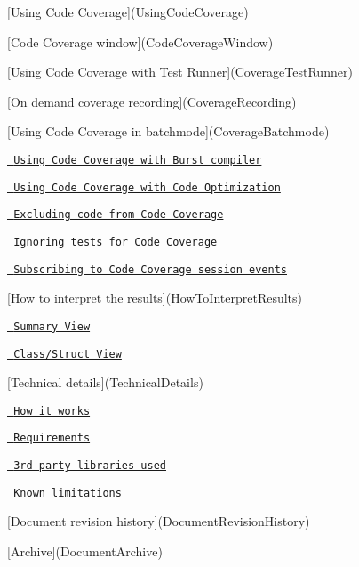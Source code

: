 \mbox{[}Using Code Coverage\mbox{]}(Using\+Code\+Coverage)
\begin{DoxyItemize}
\item \mbox{[}Code Coverage window\mbox{]}(Code\+Coverage\+Window)
\item \mbox{[}Using Code Coverage with Test Runner\mbox{]}(Coverage\+Test\+Runner)
\item \mbox{[}On demand coverage recording\mbox{]}(Coverage\+Recording)
\item \mbox{[}Using Code Coverage in batchmode\mbox{]}(Coverage\+Batchmode)
\item \href{UsingCodeCoverage\#using-code-coverage-with-burst-compiler}{\texttt{ Using Code Coverage with Burst compiler}}
\item \href{UsingCodeCoverage\#using-code-coverage-with-code-optimization}{\texttt{ Using Code Coverage with Code Optimization}}
\item \href{UsingCodeCoverage\#excluding-code-from-code-coverage}{\texttt{ Excluding code from Code Coverage}}
\item \href{UsingCodeCoverage\#ignoring-tests-for-code-coverage}{\texttt{ Ignoring tests for Code Coverage}}
\item \href{UsingCodeCoverage\#subscribing-to-code-coverage-session-events}{\texttt{ Subscribing to Code Coverage session events}}
\end{DoxyItemize}

\mbox{[}How to interpret the results\mbox{]}(How\+To\+Interpret\+Results)
\begin{DoxyItemize}
\item \href{HowToInterpretResults\#summary-view}{\texttt{ Summary View}}
\item \href{HowToInterpretResults\#classstruct-view}{\texttt{ Class/\+Struct View}}
\end{DoxyItemize}

\mbox{[}Technical details\mbox{]}(Technical\+Details)
\begin{DoxyItemize}
\item \href{TechnicalDetails\#how-it-works}{\texttt{ How it works}}
\item \href{TechnicalDetails\#requirements}{\texttt{ Requirements}}
\item \href{TechnicalDetails\#3rd-party-libraries-used}{\texttt{ 3rd party libraries used}}
\item \href{TechnicalDetails\#known-limitations}{\texttt{ Known limitations}}
\end{DoxyItemize}

\mbox{[}Document revision history\mbox{]}(Document\+Revision\+History)
\begin{DoxyItemize}
\item \mbox{[}Archive\mbox{]}(Document\+Archive) 
\end{DoxyItemize}